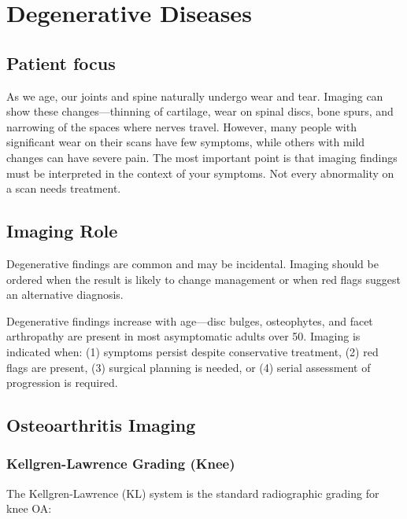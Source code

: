 \chapter{Degenerative Diseases}

\section*{Patient focus}
As we age, our joints and spine naturally undergo wear and tear. Imaging can show these changes---thinning of cartilage, wear on spinal discs, bone spurs, and narrowing of the spaces where nerves travel. However, many people with significant wear on their scans have few symptoms, while others with mild changes can have severe pain. The most important point is that imaging findings must be interpreted in the context of your symptoms. Not every abnormality on a scan needs treatment.


\label{ch:ch69_degenerative}

\section{Imaging Role}
Degenerative findings are common and may be incidental. Imaging should be ordered when the result is likely to change management or when red flags suggest an alternative diagnosis.

\begin{pearlbox}
Degenerative findings increase with age---disc bulges, osteophytes, and facet arthropathy are present in most asymptomatic adults over 50. Imaging is indicated when: (1) symptoms persist despite conservative treatment, (2) red flags are present, (3) surgical planning is needed, or (4) serial assessment of progression is required.
\end{pearlbox}

\section{Osteoarthritis Imaging}

\subsection{Kellgren-Lawrence Grading (Knee)}
The Kellgren-Lawrence (KL) system is the standard radiographic grading for knee OA:

